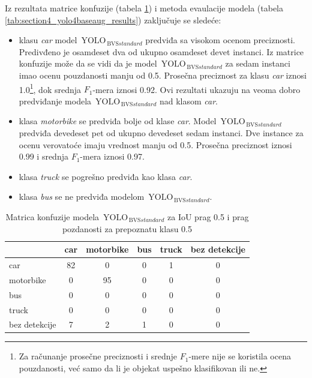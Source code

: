 \documentclass[12pt,oneside]{memoir}
\newcommand{\yolo}{\ensuremath{\,\textrm{YOLO}}}
\newcommand{\bvs}{\ensuremath{\,\textrm{BVS}}}
\begin{document}
Iz rezultata matrice konfuzije (tabela \ref{tab:section4_yolo4baseaug_confusionmatrix}) i metoda evaulacije modela (tabela \ref{tab:section4_yolo4baseaug_results}) zaključuje se sledeće:
\begin{itemize}
    \item klasu \textit{car} model  $\yolo_{\bvs{standard}}$ predviđa sa visokom ocenom preciznosti. Predivđeno je osamdeset dva od ukupno osamdeset devet instanci. Iz matrice konfuzije može da se vidi da je model  $\yolo_{\bvs{standard}}$ za sedam instanci imao ocenu pouzdanosti manju od 0.5. Prosečna preciznost za klasu \textit{car} iznosi 1.0\footnote{Za računanje prosečne preciznosti i srednje $F_1$-mere nije se koristila ocena pouzdanosti, već samo da li je objekat uspešno klasifikovan ili ne.}, dok srednja $F_1$-mera iznosi 0.92. Ovi rezultati ukazuju na veoma dobro predviđanje modela  $\yolo_{\bvs{standard}}$ nad klasom \textit{car}.
    \item klasa \textit{motorbike} se predviđa bolje od klase \textit{car}. Model  $\yolo_{\bvs{standard}}$ predviđa devedeset pet od ukupno devedeset sedam instanci. Dve instance za ocenu verovatoće imaju vrednost manju od 0.5. Prosečna preciznost iznosi 0.99 i srednja $F_1$-mera iznosi 0.97.
    \item klasa \textit{truck} se pogrešno predviđa kao klasa \textit{car}. 
    \item  klasa \textit{bus} se ne predviđa modelom  $\yolo_{\bvs{standard}}$.
\end{itemize}


\begin{table}
    \begin{center}
    \caption{Matrica konfuzije modela $\yolo_{\bvs{standard}}$ za IoU prag 0.5 i prag pozdanosti za prepoznatu klasu 0.5 }
    \begin{tabular}{ l|c|c|c|c|c|}
                  & car  & motorbike & bus & truck & bez detekcije \\ \hline
    car           & 82   & 0         & 0   & 1     & 0             \\ 
    motorbike     & 0    & 95        & 0   & 0     & 0             \\ 
    bus           & 0    & 0         & 0   & 0     & 0             \\ 
    truck         & 0    & 0         & 0   & 0     & 0             \\ 
    bez detekcije & 7    & 2         & 1   & 0     & 0             \\ \hline
    \hline
    \end{tabular}
    \label{tab:section4_yolo4baseaug_confusionmatrix}
    \end{center}
\end{table}
\end{document}
